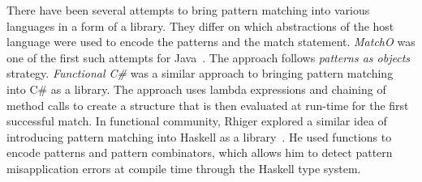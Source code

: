There have been several attempts to bring pattern matching into various 
languages in a form of a library. They differ on which abstractions of the host 
language were used to encode the patterns and the match statement. \emph{MatchO} was one of the first 
such attempts for Java~\cite{Visser06matchingobjects}. The approach follows 
\emph{patterns as objects} strategy.
%
\emph{Functional C\#} was a similar approach to bringing pattern matching into 
C\# as a library\cite{FuncCSharp}. The approach uses lambda expressions and 
chaining of method calls to create a structure that is then evaluated at 
run-time for the first successful match. %
%
In functional community, Rhiger explored a similar idea of introducing pattern 
matching into Haskell as a library~\cite{Rhiger09}. He used functions to encode 
patterns and pattern combinators, which allows him to detect pattern 
misapplication errors at compile time through the Haskell type system. 
